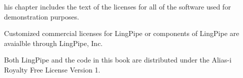 \newlength{\oldbaselineskip}
\setlength{\oldbaselineskip}{\baselineskip}

\noindent
{}his chapter includes the text of the licenses for all of
the software used for demonstration purposes.



\noindent
Customized commercial licenses for LingPipe or components of LingPipe
are avaialble through LingPipe, Inc.


\noindent
Both LingPipe and the code in this book are distributed under
the Alias-i Royalty Free License Version 1.
\\[2pt]

